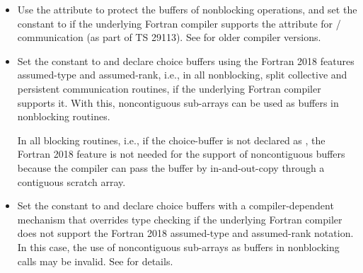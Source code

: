 \begin{itemize}
\item Use the  attribute to protect the buffers
of nonblocking operations,
and set the   constant
 to 
if the underlying Fortran compiler supports the 
attribute for \MPI/ communication (as part of TS 29113).
See 
for older compiler versions.
\item Set the  constant
 to  and
declare choice buffers using the Fortran 2018
features assumed-type
and assumed-rank, i.e., 
in all nonblocking, split collective and persistent communication routines,
if the underlying Fortran compiler supports it.
With this, noncontiguous sub-arrays can be used as buffers
in nonblocking routines.
\begin{rationale}
In all blocking routines, i.e., if the choice-buffer
is not declared as , the
Fortran 2018 feature is not needed
for the support of noncontiguous buffers because the compiler
can pass the buffer by in-and-out-copy through a contiguous scratch
array.
\end{rationale}
\item Set the 
constant to  and
declare choice buffers with a compiler-dependent mechanism that
overrides type checking if the underlying Fortran compiler does not
support the Fortran 2018 assumed-type
and assumed-rank notation.
In this case, the use of noncontiguous sub-arrays as buffers
in nonblocking calls may be invalid.
See  for details.
\end{itemize}

